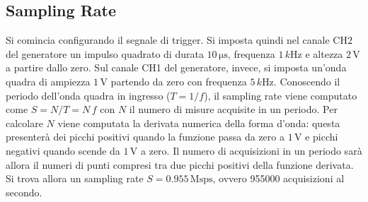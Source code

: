 \documentclass[a4paper,11pt]{article} %
\begin{document}

\subsection{Sampling Rate}
Si comincia configurando il segnale di trigger. Si imposta quindi nel canale CH2 del generatore un impulso quadrato di
durata $10\,\si{\us}$, frequenza $1\,\si{k\hertz}$ e altezza $2\,\si{\volt}$ a partire dallo zero. Sul canale CH1 del
generatore, invece, si imposta un'onda quadra di ampiezza $1\,\si{\volt}$ partendo da zero con frequenza
$5\,\si{k\hertz}$. Conoscendo il periodo dell'onda quadra in ingresso ($T=1/f$), il sampling rate viene computato come
$S = N / T = N \, f$ con $N$ il numero di misure acquisite in un periodo. Per calcolare $N$ viene computata la derivata
numerica della forma d'onda: questa presenterà dei picchi positivi quando la funzione passa da zero a $1\,\si{\volt}$ e
picchi negativi quando scende da $1\,\si{\volt}$ a zero. Il numero di acquisizioni in un periodo sarà allora il numeri
di punti compresi tra due picchi positivi della funzione derivata. Si trova allora un sampling rate $S = 0.955\,\text{Msps}$,
ovvero 955000 acquisizioni al secondo.


\end{document}
